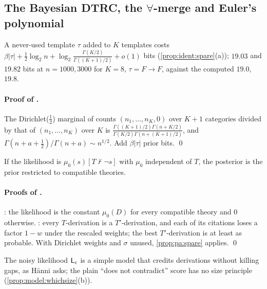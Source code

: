 \subsection{The Bayesian DTRC, the \texorpdfstring{$\forall$}{forall}-merge and Euler's polynomial}\label{app:pa:dtrc}

\begin{proposition}\pabrk{}\label{prop:pa:spare}
A never-used template $\tau$ added to $K$ templates costs $\beta|\tau|+\frac12\log_2n+\log_2\frac{\Gamma(K/2)}{\Gamma((K+1)/2)}+o(1)$ bits (\cref{prop:ident:spare}(a)); $19.03$ and $19.82$ bits at $n=1000,3000$ for $K=8$, $\tau=F\to F$, against the computed $19.0$, $19.8$.
\end{proposition}

\paragraph{Proof of .} The Dirichlet($\frac12$) marginal of counts $(n_1,\dots,n_K,0)$ over $K+1$ categories divided by that of $(n_1,\dots,n_K)$ over $K$ is $\frac{\Gamma((K+1)/2)\Gamma(n+K/2)}{\Gamma(K/2)\Gamma(n+(K+1)/2)}$, and $\Gamma(n+a+\frac12)/\Gamma(n+a)\sim n^{1/2}$. Add $\beta|\tau|$ prior bits. \qed

\begin{proposition}\pabrk{}\label{prop:pa:nc}
If the likelihood is $\mu_0(s)[T\nvdash\neg s]$ with $\mu_0$ independent of $T$, the posterior is the prior restricted to compatible theories.
\end{proposition}

\paragraph{Proofs of .} : the likelihood is the constant $\mu_0(D)$ for every compatible theory and $0$ otherwise. : every $T$-derivation is a $T'$-derivation, and each of its citations loses a factor $1-w$ under the rescaled weights; the best $T'$-derivation is at least as probable. With Dirichlet weights and $\sigma$ unused, \cref{prop:pa:spare} applies. \qed

\noindent The noisy likelihood $\mathsf{L}_{\varepsilon}$ is a simple model that credits derivations without killing gaps, as H\"anni asks; the plain ``does not contradict'' score has no size principle (\cref{prop:model:whichsize}(b)).

